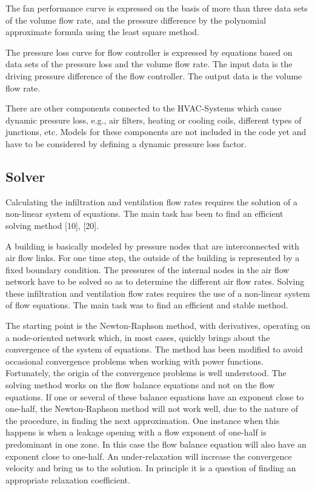 \documentclass[10pt]{book}
\begin{document}
The fan performance curve is expressed on the basis of more than three data sets of the volume flow rate, and the pressure difference by the polynomial approximate formula using the least square method.

The pressure loss curve for flow controller is expressed by equations based on data sets of the pressure loss and the volume flow rate. The input data is the driving pressure difference of the flow controller. The output data is the volume flow rate.

There are other components connected to the HVAC-Systems which cause dynamic pressure loss, e.g., air filters, heating or cooling coils, different types of junctions, etc. Models for these components are not included in the code yet and have to be considered by defining a dynamic pressure loss factor.

\subsection{Solver}

Calculating the infiltration and ventilation flow rates requires the solution of a non-linear system of equations. The main task has been to find an efficient solving method [10], [20].

A building is basically modeled by pressure nodes that are interconnected with air flow links. For one time step, the outside of the building is represented by a fixed boundary condition. The pressures of the internal nodes in the air flow network have to be solved so as to determine the different air flow rates. Solving these infiltration and ventilation flow rates requires the use of a non-linear system of flow equations. The main task was to find an efficient and stable method.

The starting point is the Newton-Raphson method, with derivatives, operating on a node-oriented network which, in most cases, quickly brings about the convergence of the system of equations. The method has been modified to avoid occasional convergence problems when working with power functions. Fortunately, the origin of the convergence problems is well understood. The solving method works on the flow balance equations and not on the flow equations. If one or several of these balance equations have an exponent close to one-half, the Newton-Raphson method will not work well, due to the nature of the procedure, in finding the next approximation. One instance when this happens is when a leakage opening with a flow exponent of one-half is predominant in one zone. In this case the flow balance equation will also have an exponent close to one-half. An under-relaxation will increase the convergence velocity and bring us to the solution. In principle it is a question of finding an appropriate relaxation coefficient.
\end{document}

